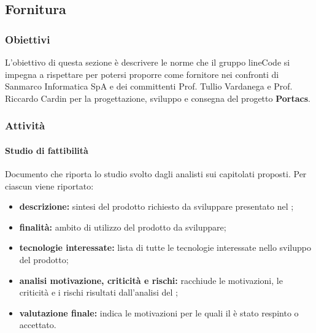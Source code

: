 \subsection{Fornitura}

	\subsubsection{Obiettivi}
	L'obiettivo di questa sezione è descrivere le norme che il gruppo lineCode si impegna a rispettare per potersi proporre come fornitore nei confronti di Sanmarco Informatica SpA e dei committenti Prof. Tullio Vardanega e Prof. Riccardo Cardin per la progettazione, sviluppo e consegna del progetto \textbf{Portacs}.

	\subsubsection{Attività}
		\paragraph{Studio di fattibilità}
		Documento che riporta lo studio svolto dagli analisti sui capitolati proposti. Per ciascun  viene riportato:
		\begin{itemize}
			\item \textbf{descrizione:} sintesi del prodotto richiesto da sviluppare presentato nel ;
		 	\item \textbf{finalità:} ambito di utilizzo del prodotto da sviluppare;
		 	\item \textbf{tecnologie interessate:} lista di tutte le tecnologie interessate nello sviluppo del prodotto;
		 	\item \textbf{analisi motivazione, criticità e rischi:} racchiude le motivazioni, le criticità e i rischi risultati dall'analisi del ;
		 	\item \textbf{valutazione finale:} indica le motivazioni per le quali il  è stato respinto o accettato.
		\end{itemize}

